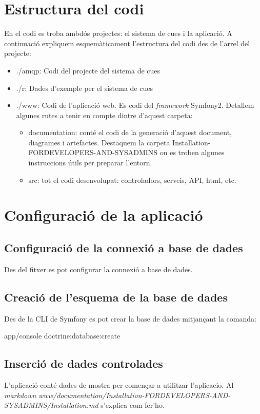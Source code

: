 \section{Estructura del codi}
En el codi es troba ambdós projectes: el sistema de cues i la aplicació. A continuació expliquem esquemàticament l'estructura del codi des de l'arrel del projecte:
\begin{itemize}
\item ./amqp: Codi del projecte del sistema de cues
\item ./r: Dades d'exemple per el sistema de cues
\item ./www: Codi de l'aplicació web. Es codi del \textit{framework} Symfony2. Detallem algunes rutes a tenir en compte dintre d'aquest carpeta:
\begin{itemize}
\item documentation: cont\'{e} el codi de la generació d'aquest document, diagrames i artefactes. Destaquem la carpeta Installation-FORDEVELOPERS-AND-SYSADMINS on es troben algunes instruccions útils per preparar l'entorn.
\item src: tot el codi desenvolupat: controladors, serveis, API, html, etc.
\end{itemize}
\end{itemize}

\section{Configuració de la aplicació}
\subsection{Configuració de la connexió a base de dades}
Des del fitxer  es pot configurar la connexió a base de dades.

\subsection{Creació de l'esquema de la base de dades}
Des de la CLI de Symfony es pot crear la base de dades mitjançant la comanda:
\begin{center}
app/console doctrine:database:create
\end{center}

\subsection{Inserció de dades controlades}
L'aplicació cont\'{e} dades de mostra per començar a utilitzar l'aplicacio. Al \textit{markdown} \textit{www/documentation/Installation-FORDEVELOPERS-AND-SYSADMINS/Installation.md} s'explica com fer'ho.

